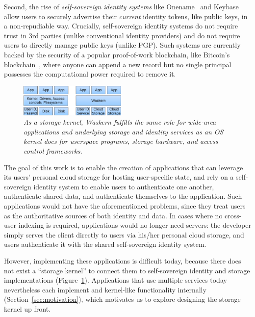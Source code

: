 Second, the rise of \textit{self-sovereign identity systems} like
Onename~\cite{onename} and Keybase~\cite{keybase} allow users to
securely advertise their \textit{current} identity tokens, like public keys, in a
non-repudiable way.  Crucially, self-sovereign identity systems do not
require trust in 3rd parties (unlike conventional identity providers)
and do not require users to directly manage public keys (unlike PGP).
Such systems are currently backed by the security of a popular proof-of-work blockchain, like
Bitcoin's blockchain~\cite{bitcoin}, where anyone can append a new record
but no single principal possesses the computational power required to remove it.

\begin{figure}[h!]
\centering
\includegraphics[width=0.47\textwidth]{figures/kernel}
\caption{\it As a storage kernel, Waskern fulfills the same role for wide-area
applications and underlying storage and identity services as an OS kernel does
   for userspace programs, storage hardware, and access control frameworks.}
\label{fig:kernel}
\end{figure}

The goal of this work is to enable the creation of applications that can
leverage its users' personal cloud storage for hosting user-specific state, and
rely on a self-sovereign identity system to enable users to authenticate one
another, authenticate shared data, and authenticate themselves to the application.
Such applications would not have the aforementioned problems, since they
treat users as the authoritative sources of both identity and data.  In cases
where no cross-user indexing is required, applications would no longer need
servers:  the developer simply serves the client directly to users via his/her
personal cloud storage, and users authenticate it with the shared self-sovereign
identity system.

However, implementing these applications is difficult today,
because there does not exist a ``storage kernel'' to connect them to
self-sovereign identity and storage implementations (Figure~\ref{fig:kernel}).
Applications that use multiple services today nevertheless each implement and
kernel-like functionality internally (Section~\ref{sec:motivation}), which motivates us to
explore designing the storage kernel up front.

